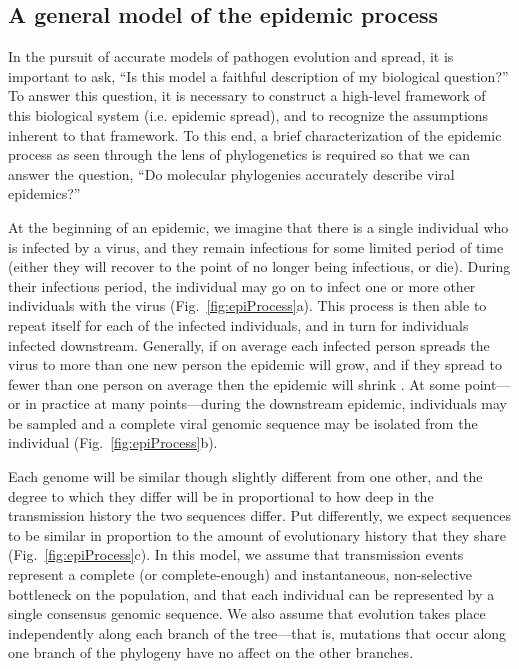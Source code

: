 \subsection{A general model of the epidemic process}
In the pursuit of accurate models of pathogen evolution and spread, it is important to ask, ``Is this model a faithful description of my biological question?''
To answer this question, it is necessary to construct a high-level framework of this biological system (i.e. epidemic spread), and to recognize the assumptions inherent to that framework.
To this end, a brief characterization of the epidemic process as seen through the lens of phylogenetics is required so that we can answer the question, ``Do molecular phylogenies accurately describe viral epidemics?''

At the beginning of an epidemic, we imagine that there is a single individual who is infected by a virus, and they remain infectious for some limited period of time (either they will recover to the point of no longer being infectious, or die).
During their infectious period, the individual may go on to infect one or more other individuals with the virus (Fig.~\ref{fig:epiProcess}a).
This process is then able to repeat itself for each of the infected individuals, and in turn for individuals infected downstream.
Generally, if on average each infected person spreads the virus to more than one new person the epidemic will grow, and if they spread to fewer than one person on average then the epidemic will shrink \citep{dietz1993estimation}.
At some point---or in practice at many points---during the downstream epidemic, individuals may be sampled and a complete viral genomic sequence may be isolated from the individual (Fig.~\ref{fig:epiProcess}b).

Each genome will be similar though slightly different from one other, and the degree to which they differ will be in proportional to how deep in the transmission history the two sequences differ.
Put differently, we expect sequences to be similar in proportion to the amount of evolutionary history that they share (Fig.~\ref{fig:epiProcess}c).
In this model, we assume that transmission events represent a complete (or complete-enough) and instantaneous, non-selective bottleneck on the population, and that each individual can be represented by a single consensus genomic sequence.
We also assume that evolution takes place independently along each branch of the tree---that is, mutations that occur along one branch of the phylogeny have no affect on the other branches.

